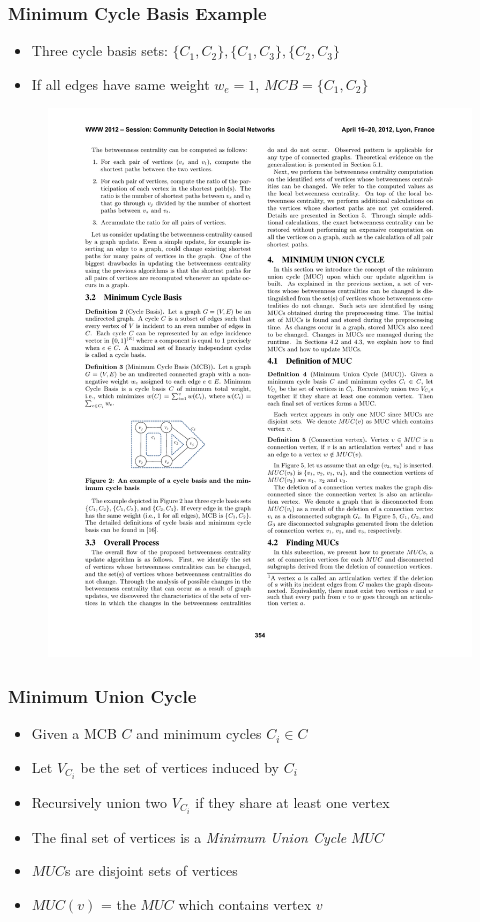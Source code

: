 \begin{frame}
  \frametitle{Minimum Cycle Basis Example}
  \begin{itemize}
    \item Three cycle basis sets: $\{C_1, C_2\} , \{C_1, C_3\} , \{C_2, C_3\}$
    \item If all edges have same weight $w_e = 1$, $MCB = \{C_1, C_2\}$
  \end{itemize}
  \begin{figure}[H]
    \centering
    \includegraphics[scale=2]{imgs/qube-mcb}
  \end{figure}
\end{frame}


\begin{frame}
  \frametitle{Minimum Union Cycle}

  \begin{itemize}
    \item Given a MCB $C$ and minimum cycles $C_i \in C$
    \item Let $V_{C_i}$ be the set of vertices induced by $C_i$
    \item Recursively union two $V_{C_i}$ if they share at least one vertex
    \item The final set of vertices is a \emph{Minimum Union Cycle} $MUC$
  \end{itemize}

  \begin{itemize}
    \item $MUC$s are disjoint sets of vertices
    \item $MUC(v)$ = the $MUC$ which contains vertex $v$
  \end{itemize}
\end{frame}


